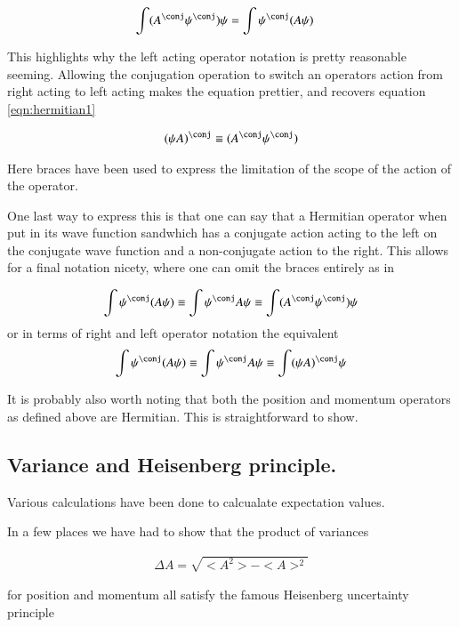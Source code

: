 \documentclass{article}
\begin{document}
\begin{align*}
\int (A^\conj \psi^\conj) \psi &= \int \psi^\conj (A \psi)
\end{align*}

This highlights why the left acting operator notation is pretty reasonable
seeming.  Allowing the conjugation operation to switch an operators action
from right acting to left acting makes the equation prettier, and 
recovers equation \ref{eqn:hermitian1}

\begin{align*}
(\psi A)^\conj \equiv (A^\conj \psi^\conj) 
\end{align*}

Here braces have been used to express the limitation of the scope of the action of the operator.

One last way to express this is that one can say that a Hermitian operator when put 
in its wave function sandwhich has a 
conjugate action acting to the left on the conjugate wave function and a non-conjugate
action to the right.  This allows for a final notation nicety, where one can omit the 
braces entirely as in

\begin{align*}
\int \psi^\conj (A \psi) \equiv \int \psi^\conj A \psi \equiv \int (A^\conj \psi^\conj) \psi
\end{align*}
or in terms of right and left operator notation the equivalent
\begin{align*}
\int \psi^\conj (A \psi) \equiv \int \psi^\conj A \psi \equiv \int (\psi A)^\conj \psi
\end{align*}

It is probably also worth noting that both 
the position and momentum operators as defined above are Hermitian.  This is 
straightforward to show.

\subsection{ Variance and Heisenberg principle. }

Various calculations have been done to calcualate expectation values.

In a few places we have had to show that the product of variances

\begin{align*}
\Delta A = \sqrt{<A^2> - <A>^2}
\end{align*}

for position and momentum all satisfy the famous Heisenberg uncertainty
principle
\end{document}
